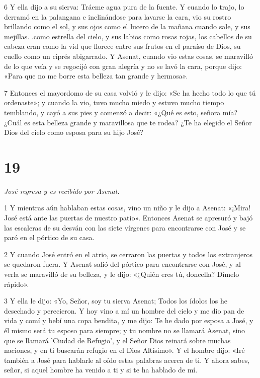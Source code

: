 \par 6 Y ella dijo a su sierva: Tráeme agua pura de la fuente. Y cuando lo trajo, lo derramó en la palangana e inclinándose para lavarse la cara, vio su rostro brillando como el sol, y sus ojos como el lucero de la mañana cuando sale, y sus mejillas. .como estrella del cielo, y sus labios como rosas rojas, los cabellos de su cabeza eran como la vid que florece entre sus frutos en el paraíso de Dios, su cuello como un ciprés abigarrado. Y Asenat, cuando vio estas cosas, se maravilló de lo que veía y se regocijó con gran alegría y no se lavó la cara, porque dijo: «Para que no me borre esta belleza tan grande y hermosa».

\par 7 Entonces el mayordomo de su casa volvió y le dijo: «Se ha hecho todo lo que tú ordenaste»; y cuando la vio, tuvo mucho miedo y estuvo mucho tiempo temblando, y cayó a sus pies y comenzó a decir: «¿Qué es esto, señora mía? ¿Cuál es esta belleza grande y maravillosa que te rodea? ¿Te ha elegido el Señor Dios del cielo como esposa para su hijo José?

\chapter{19}

\par \textit{José regresa y es recibido por Asenat.}

\par 1 Y mientras aún hablaban estas cosas, vino un niño y le dijo a Asenat: «¡Mira! José está ante las puertas de nuestro patio». Entonces Asenat se apresuró y bajó las escaleras de su desván con las siete vírgenes para encontrarse con José y se paró en el pórtico de su casa.

\par 2 Y cuando José entró en el atrio, se cerraron las puertas y todos los extranjeros se quedaron fuera. Y Asenat salió del pórtico para encontrarse con José, y al verla se maravilló de su belleza, y le dijo: «¿Quién eres tú, doncella? Dímelo rápido».

\par 3 Y ella le dijo: «Yo, Señor, soy tu sierva Asenat; Todos los ídolos los he desechado y perecieron. Y hoy vino a mí un hombre del cielo y me dio pan de vida y comí y bebí una copa bendita, y me dijo: Te he dado por esposa a José, y él mismo será tu esposo para siempre; y tu nombre no se llamará Asenat, sino que se llamará 'Ciudad de Refugio', y el Señor Dios reinará sobre muchas naciones, y en ti buscarán refugio en el Dios Altísimo». Y el hombre dijo: «Iré también a José para hablarle al oído estas palabras acerca de ti. Y ahora sabes, señor, si aquel hombre ha venido a ti y si te ha hablado de mí.

